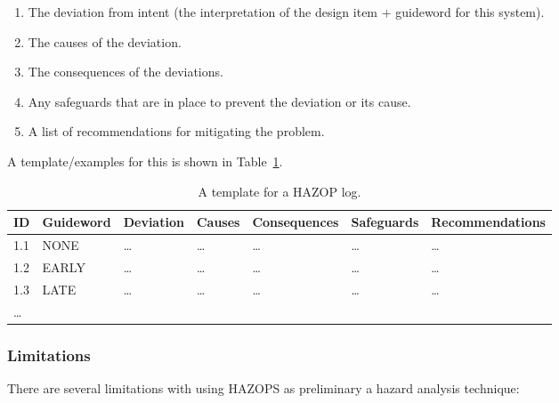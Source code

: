 \begin{enumerate}

 \item The deviation from intent (the interpretation of the design item + guideword for this system).

 \item The causes of the deviation.

 \item The consequences of the deviations.

 \item Any safeguards that are in place to prevent the deviation or its cause.

 \item A list of recommendations for mitigating the problem.

\end{enumerate}


A template/examples for this is shown in Table~\ref{fig:safety:HAZOP-log}.

\begin{table}[!h]
\centering
\begin{tabular}{lllllll}
\toprule
\textbf{ID} & \textbf{Guideword} & \textbf{Deviation} & 
 \textbf{Causes} & \textbf{Consequences} & \textbf{Safeguards} &
 \textbf{Recommendations}\\
\midrule
 1.1 & NONE & \ldots & \ldots & \ldots & \ldots & \ldots\\
 1.2 & EARLY & \ldots & \ldots & \ldots & \ldots & \ldots\\
 1.3 & LATE & \ldots & \ldots & \ldots & \ldots & \ldots\\
 \ldots & \\
\bottomrule
\end{tabular}
\caption{A template for a HAZOP log.}
\label{fig:safety:HAZOP-log}
\end{table}

\subsubsection*{Limitations}

There are several limitations with using HAZOPS as preliminary a hazard analysis technique:

